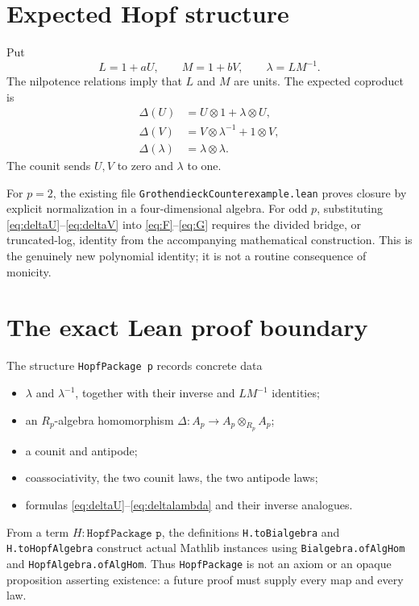 \documentclass[11pt]{article}
\newcommand{\tensor}{\otimes}
\begin{document}
\section{Expected Hopf structure}

Put
\[
 L=1+aU,\qquad M=1+bV,\qquad \lambda=LM^{-1}.
\]
The nilpotence relations imply that $L$ and $M$ are units.  The expected
coproduct is
\begin{align}
 \Delta(U)&=U\tensor1+\lambda\tensor U,\label{eq:deltaU}\\
 \Delta(V)&=V\tensor\lambda^{-1}+1\tensor V,\label{eq:deltaV}\\
 \Delta(\lambda)&=\lambda\tensor\lambda.
 \label{eq:deltalambda}
\end{align}
The counit sends $U,V$ to zero and $\lambda$ to one.

For $p=2$, the existing file
\texttt{GrothendieckCounterexample.lean} proves closure by explicit
normalization in a four-dimensional algebra.  For odd $p$, substituting
\eqref{eq:deltaU}--\eqref{eq:deltaV} into \eqref{eq:F}--\eqref{eq:G}
requires the divided bridge, or truncated-log, identity from the accompanying
mathematical construction.  This is the genuinely new polynomial identity;
it is not a routine consequence of monicity.

\section{The exact Lean proof boundary}

The structure \texttt{HopfPackage p} records concrete data
\begin{itemize}[leftmargin=2em]
\item $\lambda$ and $\lambda^{-1}$, together with their inverse and
      $LM^{-1}$ identities;
\item an $R_p$-algebra homomorphism
      $\Delta:A_p\to A_p\tensor_{R_p}A_p$;
\item a counit and antipode;
\item coassociativity, the two counit laws, the two antipode laws;
\item formulas \eqref{eq:deltaU}--\eqref{eq:deltalambda} and their inverse
      analogues.
\end{itemize}
From a term $H:\texttt{HopfPackage p}$, the definitions
\texttt{H.toBialgebra} and \texttt{H.toHopfAlgebra} construct actual Mathlib
instances using \texttt{Bialgebra.ofAlgHom} and
\texttt{HopfAlgebra.ofAlgHom}.  Thus \texttt{HopfPackage} is not an axiom or
an opaque proposition asserting existence: a future proof must supply every
map and every law.
\end{document}
